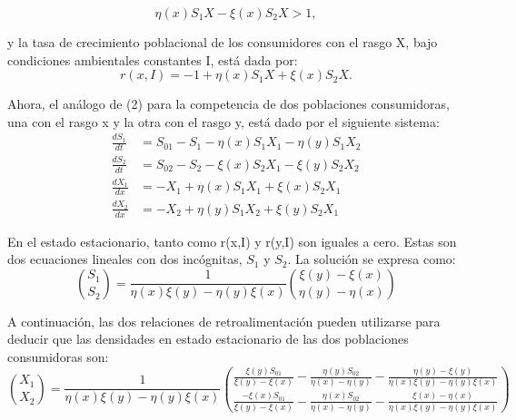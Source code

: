 \documentclass[letterpaper]{article}
\begin{document}
{        \begin{equation}
            \eta(x)S_1X-\xi(x)S_2X>1,
        \end{equation}

        \normalsize{y la tasa de crecimiento poblacional de los consumidores con el rasgo X, bajo condiciones ambientales constantes I, está dada por:}\\

        \begin{equation}
            r(x,I)=-1+\eta(x)S_1X+\xi(x)S_2X.
        \end{equation}

        \normalsize{Ahora, el análogo de (2) para la competencia de dos poblaciones consumidoras, una con el rasgo x y la otra con el rasgo y, está dado por el siguiente sistema:}\\

        \begin{equation}
        \begin{split}
            \frac{d S_1}{dt}&=S_{01}-S_1-\eta(x)S_1X_1-\eta(y)S_1X_2\\  \frac{d S_2}{dt}&=S_{02}-S_2-\xi(x)S_2X_1-\xi(y)S_2X_2\\ \frac{d X_1}{dx}&=-X_1+\eta(x)S_1X_1+\xi(x)S_2X_1\\
            \frac{d X_2}{dx}&=-X_2+\eta(y)S_1X_2+\xi(y)S_2X_1
        \end{split}
        \end{equation}

        \normalsize{En el estado estacionario, tanto como r(x,I) y r(y,I) son iguales a cero. Estas son dos ecuaciones lineales con dos incógnitas, $S_1$ y $S_2$. La solución se expresa como:}\\

        \begin{equation}
            \binom{S_1}{S_2}=\frac{1}{\eta(x)\xi(y)-\eta(y)\xi(x)}\binom{\xi(y)-\xi(x)}{\eta(y)-\eta(x)}
        \end{equation}

        
        \normalsize{A continuación, las dos relaciones de retroalimentación pueden utilizarse para deducir que las densidades en estado estacionario de las dos poblaciones consumidoras son:}\\

        \begin{equation}
            \binom{X_1}{X_2}=\frac{1}{\eta(x)\xi(y)-\eta(y)\xi(x)}\binom{\frac{\xi(y)S_{01}}{\xi(y)-\xi(x)}-\frac{\eta(y)S_{02}}{\eta(x)-\eta(y)}-\frac{\eta(y)-\xi(y)}{\eta(x)\xi(y)-\eta(y)\xi(x)}}{\frac{-\xi(x)S_{01}}{\xi(y)-\xi(x)}-\frac{\eta(x)S_{02}}{\eta(x)-\eta(y)}-\frac{\xi(x)-\eta(x)}{\eta(x)\xi(y)-\eta(y)\xi(x)}}
        \end{equation}

}
\end{document}
